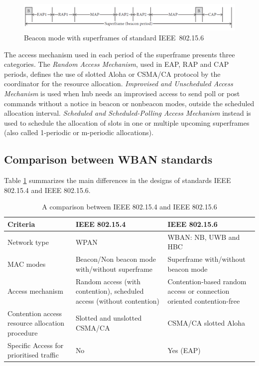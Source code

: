 \documentclass[conference]{IEEEtran}
\begin{document}
\begin{figure}[htbp]
	\centering
	\includegraphics[width=0.9\linewidth]{img/beaconModeSuperframe.png}
	\caption{Beacon mode with superframes of standard IEEE~802.15.6}
	\label{fig_beaconModeSuperframe}
\end{figure}

The access mechanism used in each period of the superframe presents three categories. The \textit{Random Access Mechanism}, used in EAP, RAP and CAP periods, defines the use of slotted Aloha or CSMA/CA protocol by the coordinator for the resource allocation. \textit{Improvised and Unscheduled Access Mechanism} is used when hub needs an improvised access to send poll or post commands without a notice in beacon or nonbeacon modes, outside the scheduled allocation interval. \textit{Scheduled and Scheduled-Polling Access Mechanism} instead is used to schedule the allocation of slots in one or multiple upcoming superframes (also called 1-periodic or m-periodic allocations). \cite{kwak2010overview} \cite{ullah2013review}

\subsection{Comparison between WBAN standards}
Table \ref{tab2} \cite{salayma2017wireless} summarizes the main differences in the designs of standards IEEE 802.15.4 and IEEE 802.15.6.

\begin{table}[htbp]
	\caption{A comparison between IEEE 802.15.4 and IEEE 802.15.6}
	\begin{tabularx}{0.5\textwidth}{X|X|X|}
		\textbf{Criteria} & \textbf{IEEE 802.15.4} & \textbf{IEEE 802.15.6} \\
		\hline
		Network type & WPAN &  WBAN: NB, UWB and HBC\\
		\hline
		MAC modes &  Beacon/Non beacon mode with/without superframe & Superframe with/without beacon mode \\
		\hline
		Access mechanism &  Random access (with contention), scheduled access (without contention) & Contention-based random access or connection oriented contention-free \\
		\hline
		Contention access resource allocation procedure	& Slotted and unslotted CSMA/CA & CSMA/CA slotted Aloha \\
		\hline
		Specific Access for prioritised traffic & No & Yes (EAP) \\
		\hline
	\end{tabularx}
	\label{tab2}
\end{table}
\end{document}
